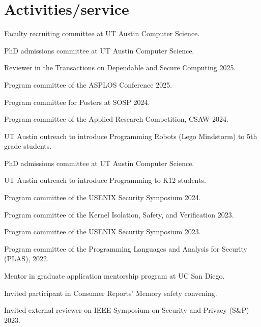 \section{Activities/service}


{ Faculty recruiting committee at UT Austin Computer Science. }

{ PhD admissions committee at UT Austin Computer Science. }

{ Reviewer in the Transactions on Dependable and Secure Computing 2025. }

{ Program committee of the ASPLOS Conference 2025. }

{ Program committee for Posters at SOSP 2024. }

{ Program committee of the Applied Research Competition, CSAW 2024. }

{ UT Austin
outreach to introduce Programming Robots (Lego Mindstorm) to 5th grade students.
}

{ PhD admissions committee at UT Austin Computer Science. }

{ UT Austin
outreach to introduce Programming to K12 students. }

{ Program committee of the USENIX Security Symposium 2024. }

{ Program committee of the Kernel Isolation, Safety, and Verification 2023. }

{ Program committee of the USENIX Security Symposium 2023. }

{ Program committee of the Programming Languages and Analysis for Security (PLAS), 2022. }

{ Mentor in 
graduate application mentorship program at UC San Diego. }

{ Invited participant in Consumer Reports' Memory safety convening. }

{ Invited external reviewer on IEEE Symposium on Security and Privacy (S\&P) 2023.}

